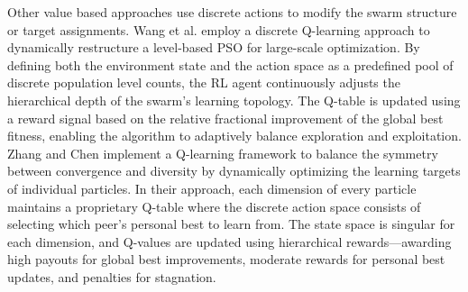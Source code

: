 \documentclass[final,5p,times]{elsarticle}
\begin{document}
Other value based approaches use discrete actions to modify the swarm structure or target assignments.
Wang et al. \cite{Wang2022ARL} employ a discrete Q-learning approach to dynamically restructure a level-based PSO for large-scale optimization. 
By defining both the environment state and the action space as a predefined pool of discrete population level counts, the RL agent continuously adjusts the hierarchical depth of the swarm's learning topology. 
The Q-table is updated using a reward signal based on the relative fractional improvement of the global best fitness, enabling the algorithm to adaptively balance exploration and exploitation.
Zhang and Chen \cite{Zhang2024ANovel} implement a Q-learning framework to balance the symmetry between convergence and diversity by dynamically optimizing the learning targets of individual particles. 
In their approach, each dimension of every particle maintains a proprietary Q-table where the discrete action space consists of selecting which peer's personal best to learn from. 
The state space is singular for each dimension, and Q-values are updated using hierarchical rewards—awarding high payouts for global best improvements, moderate rewards for personal best updates, and penalties for stagnation.
\end{document}
